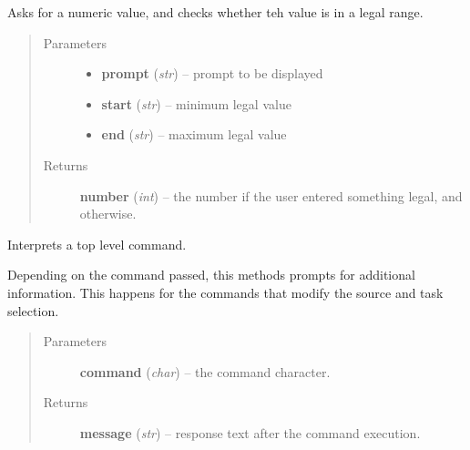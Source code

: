 \documentclass[letterpaper,10pt,english]{sphinxmanual}
\begin{document}
\begin{fulllineitems}
\begin{fulllineitems}
\end{fulllineitems}


\begin{fulllineitems}
\label{graf/graf:graf.shell.Shell.get_num}
Asks for a numeric value, and checks whether teh value is in a legal range.
\begin{quote}\begin{description}
\item[{Parameters}] \leavevmode\begin{itemize}
\item {} 
\textbf{prompt} (\emph{str}) --
prompt to be displayed

\item {} 
\textbf{start} (\emph{str}) --
minimum legal value

\item {} 
\textbf{end} (\emph{str}) --
maximum legal value

\end{itemize}

\item[{Returns}] \leavevmode
\textbf{number} (\emph{int}) --
the number if the user entered something legal,
and  otherwise.

\end{description}\end{quote}

\end{fulllineitems}


\begin{fulllineitems}
\label{graf/graf:graf.shell.Shell.main_command}
Interprets a top level command.

Depending on the command passed, this methods prompts for additional information.
This happens for the commands that modify the source and task selection.
\begin{quote}\begin{description}
\item[{Parameters}] \leavevmode
\textbf{command} (\emph{char}) --
the command character.

\item[{Returns}] \leavevmode
\textbf{message} (\emph{str}) --
response text after the command execution.


\end{description}
\end{quote}
\end{fulllineitems}
\end{fulllineitems}
\end{document}
